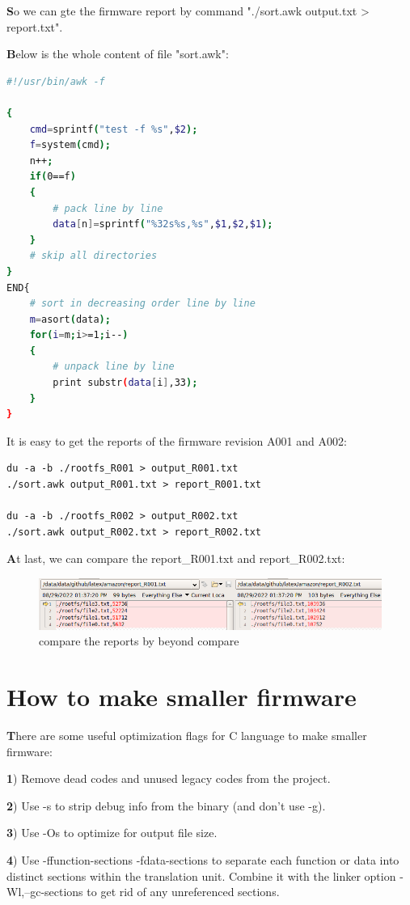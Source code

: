 \documentclass{article}
\begin{document}
\textbf
So we can gte the firmware report by command "./sort.awk output.txt > report.txt".


\textbf
Below is the whole content of file "sort.awk":


\begin{lstlisting}[language={bash}]
#!/usr/bin/awk -f

{
	cmd=sprintf("test -f %s",$2);
	f=system(cmd);
	n++;
	if(0==f)
	{
		# pack line by line
		data[n]=sprintf("%32s%s,%s",$1,$2,$1);
	}
	# skip all directories
}
END{
	# sort in decreasing order line by line
	m=asort(data);
	for(i=m;i>=1;i--)
	{
		# unpack line by line
		print substr(data[i],33);
	}
}
    \end{lstlisting}

It is easy to get the reports of the firmware revision A001 and A002:
\begin{lstlisting}[language={[ansi]C}]
du -a -b ./rootfs_R001 > output_R001.txt
./sort.awk output_R001.txt > report_R001.txt

du -a -b ./rootfs_R002 > output_R002.txt
./sort.awk output_R002.txt > report_R002.txt
    \end{lstlisting}


\textbf
At last, we can compare the report\_R001.txt and report\_R002.txt:
\begin{figure}[h]
	\centering
	\includegraphics[scale=0.5]{report.png}
	\caption{compare the reports by beyond compare}
	\label{fig:label}
\end{figure}


\section{How to make smaller firmware}

\textbf
There are some useful optimization flags for C language to make smaller firmware:

\textbf
1) Remove dead codes and unused legacy codes from the project.

\textbf
2) Use -s to strip debug info from the binary (and don't use -g).

\textbf
3) Use -Os to optimize for output file size.

\textbf
4) Use -ffunction-sections -fdata-sections to separate each function or data into distinct sections within the translation unit. Combine it with the linker option -Wl,--gc-sections to get rid of any unreferenced sections.
\end{document}
